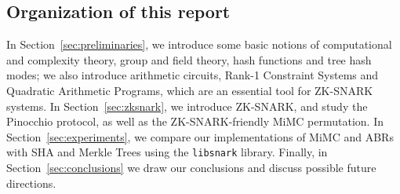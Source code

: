 \subsection*{Organization of this report}
In Section~\ref{sec:preliminaries}, we introduce some basic notions of computational and complexity
theory, group and field theory, hash functions and tree hash modes; we also introduce arithmetic
circuits, Rank-1 Constraint Systems and Quadratic Arithmetic Programs, which are an essential tool
for ZK-SNARK systems.
In Section~\ref{sec:zksnark}, we introduce ZK-SNARK, and study the Pinocchio protocol, as well
as the ZK-SNARK-friendly MiMC permutation.
In Section~\ref{sec:experiments}, we compare our implementations of MiMC and ABRs with SHA and
Merkle Trees using the \texttt{libsnark} library.
Finally, in Section~\ref{sec:conclusions} we draw our conclusions and discuss possible future
directions.
